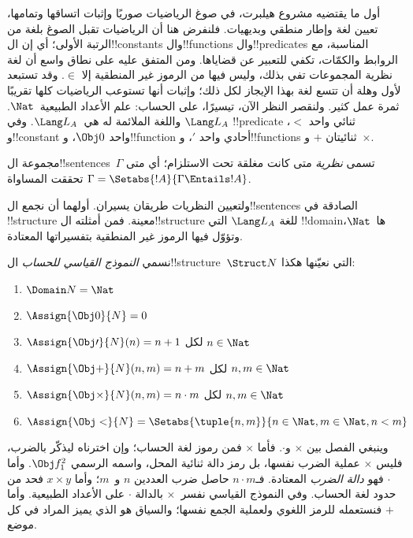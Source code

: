 \documentclass[../../../include/open-logic-section]{subfiles}
\begin{document}


أول ما يقتضيه مشروع هيلبرت، في صوغ الرياضيات صوريًا وإثبات
اتساقها وتمامها، تعيين لغة وإطار منطقي وبديهيات. فلنفرض هنا
أن الرياضيات تقبل الصوغ بلغة من الرتبة الأولى؛ أي إن
ال!!{constant}s وال!!{function}s وال!!{predicate}s المناسبة،
مع الروابط والكمّات، تكفي للتعبير عن قضاياها. ومن المتفق عليه
على نطاق واسع أن لغة نظرية المجموعات تفي بذلك، وليس فيها
من الرموز غير المنطقية إلا $\in$. وقد تستبعد لأول وهلة
أن تتسع لغة بهذا الإيجاز لكل ذلك؛ وإثبات أنها تستوعب
الرياضيات كلها تقريبًا ثمرة عمل كثير. ولنقصر النظر الآن،
تيسيرًا، على الحساب: علم الأعداد الطبيعية~$\Nat$.
واللغة الملائمة له هي~$\Lang L_A$. وفي $\Lang L_A$
!!{predicate} ثنائي واحد $<$، و!!{constant} واحد
$\Obj 0$، و!!{function} أحادي واحد $\prime$،
و!!{function}s ثنائيتان $+$ و~$\times$.

\begin{defn}
مجموعة ال!!{sentence}s~$\Gamma$ تسمى \emph{نظرية} متى
كانت مغلقة تحت الاستلزام؛ أي متى تحققت المساواة
$\Gamma = \Setabs{!A}{\Gamma \Entails !A}$.
\end{defn}

ولتعيين النظريات طريقان يسيران. أولهما أن نجمع
ال!!{sentence}s الصادقة في !!{structure} معينة.
فمن أمثلته ال!!{structure} للغة $\Lang L_A$ التي
!!{domain}ها~$\Nat$، وتؤوّل فيها الرموز غير المنطقية
بتفسيراتها المعتادة.

\begin{defn}
نسمي \emph{النموذج القياسي للحساب} ال!!{structure}~$\Struct N$
التي نعيّنها هكذا:
\begin{enumerate}
\item $\Domain N = \Nat$
\item $\Assign{\Obj 0}{N} = 0$
\item $\Assign{\Obj \prime}{N}(n) = n + 1$ لكل $n \in \Nat$
\item $\Assign{\Obj +}{N}(n, m) = n + m$ لكل $n, m \in \Nat$
\item $\Assign{\Obj \times}{N}(n, m) = n\cdot m$ لكل $n, m \in \Nat$
\item $\Assign{\Obj <}{N} = \Setabs{\tuple{n, m}}{n \in \Nat, m \in
  \Nat, n < m}$
\end{enumerate}
\end{defn}

وينبغي الفصل بين $\times$ و$\cdot$. فأما $\times$
فمن رموز لغة الحساب؛ وإن اخترناه ليذكّر بالضرب،
فليس $\times$ عملية الضرب نفسها، بل رمز دالة ثنائية
المحل، واسمه الرسمي $\Obj f^2_1$. وأما $\cdot$
فهو \emph{دالة الضرب} المعتادة. فـ$n\cdot m$ حاصل
ضرب العددين $n$ و~$m$؛ وأما $x\times y$ فحد من
حدود لغة الحساب. وفي النموذج القياسي نفسر~$\times$
بالدالة $\cdot$ على الأعداد الطبيعية. وأما $+$
فنستعمله للرمز اللغوي ولعملية الجمع نفسها؛ والسياق
هو الذي يميز المراد في كل موضع.
\end{document}
